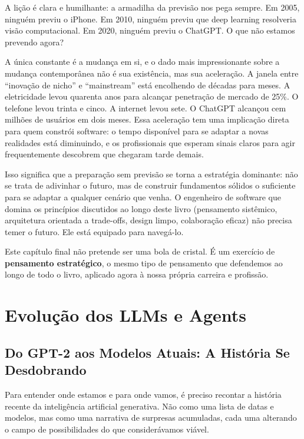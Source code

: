 A lição é clara e humilhante: a armadilha da previsão nos pega sempre.
Em 2005, ninguém previu o iPhone. Em 2010, ninguém previu que deep
learning resolveria visão computacional. Em 2020, ninguém previu o
ChatGPT. O que não estamos prevendo agora?

A única constante é a mudança em si, e o dado mais impressionante sobre
a mudança contemporânea não é sua existência, mas sua aceleração. A
janela entre ``inovação de nicho'' e ``mainstream'' está encolhendo de
décadas para meses. A eletricidade levou quarenta anos para alcançar
penetração de mercado de 25\%. O telefone levou trinta e cinco. A
internet levou sete. O ChatGPT alcançou cem milhões de usuários em dois
meses. Essa aceleração tem uma implicação direta para quem constrói
software: o tempo disponível para se adaptar a novas realidades está
diminuindo, e os profissionais que esperam sinais claros para agir
frequentemente descobrem que chegaram tarde demais.

Isso significa que a preparação sem previsão se torna a estratégia
dominante: não se trata de adivinhar o futuro, mas de construir
fundamentos sólidos o suficiente para se adaptar a qualquer cenário que
venha. O engenheiro de software que domina os princípios discutidos ao
longo deste livro (pensamento sistêmico, arquitetura orientada a
trade-offs, design limpo, colaboração eficaz) não precisa temer o
futuro. Ele está equipado para navegá-lo.

Este capítulo final não pretende ser uma bola de cristal. É um exercício de
\textbf{pensamento estratégico}, o mesmo tipo de pensamento que defendemos ao
longo de todo o livro, aplicado agora à nossa própria carreira e profissão.

\section{Evolução dos LLMs e Agents}

\subsection{Do GPT-2 aos Modelos Atuais: A História Se Desdobrando}

Para entender onde estamos e para onde vamos, é preciso recontar a
história recente da inteligência artificial generativa. Não como uma
lista de datas e modelos, mas como uma narrativa de surpresas
acumuladas, cada uma alterando o campo de possibilidades do que
considerávamos viável.

